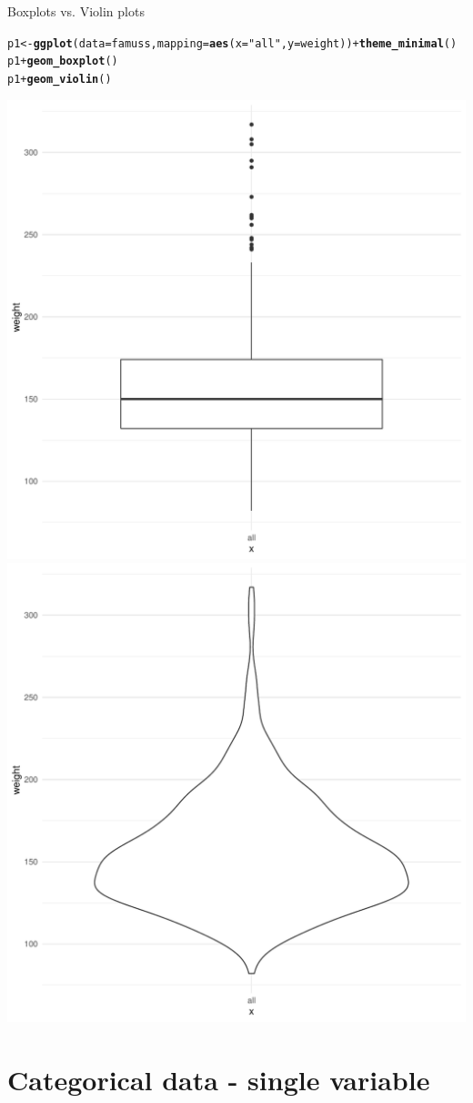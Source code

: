 \documentclass[10pt,handout]{beamer}\usepackage[]{graphicx}\usepackage[]{color}
\makeatletter
\newcommand{\hlstr}[1]{\textcolor[rgb]{0.192,0.494,0.8}{#1}}%
\newcommand{\hlopt}[1]{\textcolor[rgb]{0,0,0}{#1}}%
\newcommand{\hlstd}[1]{\textcolor[rgb]{0.345,0.345,0.345}{#1}}%
\newcommand{\hlkwb}[1]{\textcolor[rgb]{0.69,0.353,0.396}{#1}}%
\newcommand{\hlkwc}[1]{\textcolor[rgb]{0.333,0.667,0.333}{#1}}%
\newcommand{\hlkwd}[1]{\textcolor[rgb]{0.737,0.353,0.396}{\textbf{#1}}}%
\newenvironment{kframe}{%
 \def\at@end@of@kframe{}%
 \ifinner\ifhmode%
  \def\at@end@of@kframe{\end{minipage}}%
  \begin{minipage}{\columnwidth}%
 \fi\fi%
 \def\FrameCommand##1{\hskip\@totalleftmargin \hskip-\fboxsep
 \colorbox{shadecolor}{##1}\hskip-\fboxsep
     \hskip-\linewidth \hskip-\@totalleftmargin \hskip\columnwidth}%
 \MakeFramed {\advance\hsize-\width
   \@totalleftmargin\z@ \linewidth\hsize
   \@setminipage}}%
 {\par\unskip\endMakeFramed%
 \at@end@of@kframe}
\newenvironment{knitrout}{}{} %
\makeatother
\begin{document}
\begin{frame}[fragile]{Boxplots vs. Violin plots}
	
\begin{knitrout}\scriptsize
{}\color{fgcolor}\begin{kframe}
\begin{alltt}
\hlstd{p1} \hlkwb{<-} \hlkwd{ggplot}\hlstd{(}\hlkwc{data} \hlstd{= famuss,} \hlkwc{mapping} \hlstd{=} \hlkwd{aes}\hlstd{(}\hlkwc{x} \hlstd{=} \hlstr{"all"}\hlstd{,} \hlkwc{y} \hlstd{= weight))} \hlopt{+} \hlkwd{theme_minimal}\hlstd{()}
\hlstd{p1} \hlopt{+} \hlkwd{geom_boxplot}\hlstd{()}
\hlstd{p1} \hlopt{+} \hlkwd{geom_violin}\hlstd{()}
\end{alltt}
\end{kframe}

{\centering \includegraphics[width=0.45\linewidth]{figure/unnamed-chunk-2-1} 
\includegraphics[width=0.45\linewidth]{figure/unnamed-chunk-2-2} 

}



\end{knitrout}
	
\end{frame}

		
		\hypertarget{categorical-data}{%
	\section{Categorical data - single variable}\label{categorical-data}}
		
\end{document}
